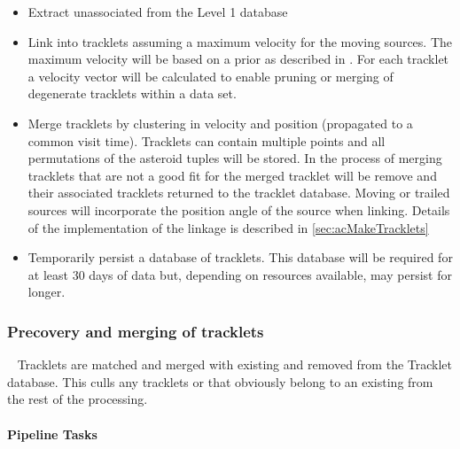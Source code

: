 \begin{itemize}
\item Extract unassociated \DIASources from the Level 1 database
\item Link \DIASources into tracklets assuming a maximum velocity for the moving sources. The maximum velocity will be based on a prior as described in  \cite{kubica05}. For each tracklet a velocity vector will be calculated to enable pruning or merging of degenerate tracklets within a data set. 
\item Merge tracklets by clustering in velocity and position (propagated to a common visit time). Tracklets can contain multiple points and all permutations of the asteroid tuples will be stored. In the process of merging tracklets \DIASources that are not a good fit for the merged tracklet will be remove and their associated tracklets returned to the tracklet database.  Moving or trailed sources will incorporate the position angle of the source when linking. Details of the implementation of the \DIASource linkage is described in \ref{sec:acMakeTracklets}
\item Temporarily persist a database of tracklets. This database will be required for at least 30 days of data but, depending on resources available, may persist for longer.
\end{itemize}


\subsubsection{Precovery and merging of tracklets}~
Tracklets are matched and merged with existing \SSObjects and removed from the Tracklet database. This culls any tracklets or \DIASources that obviously belong to an existing \SSObject from the rest of the processing. 

\paragraph{Pipeline Tasks}

